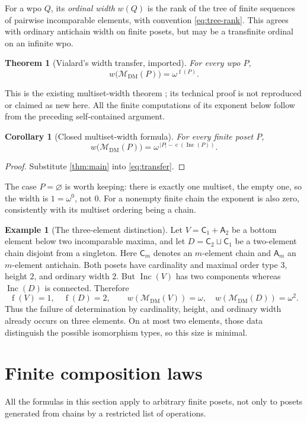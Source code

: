 \documentclass[11pt,letterpaper]{article}
\newtheorem{theorem}{Theorem}[section]
\newtheorem{corollary}[corollary]{Corollary}
\theoremstyle{definition}
\newtheorem{example}[example]{Example}
\theoremstyle{remark}
\newcommand{\fot}{\operatorname{f}}
\newcommand{\Inc}{\operatorname{Inc}}
\newcommand{\cc}{\operatorname{c}}
\newcommand{\DM}{\mathrm{DM}}
\newcommand{\M}{\mathcal M}
\newcommand{\C}{\mathsf C}
\newcommand{\A}{\mathsf A}
\begin{document}
For a wpo $Q$, its \emph{ordinal width} $w(Q)$ is the rank of the tree of
finite sequences of pairwise incomparable elements, with convention
\eqref{eq:tree-rank}. This agrees with ordinary antichain width on finite
posets, but may be a transfinite ordinal on an infinite wpo.

\begin{theorem}[Vialard's width transfer, imported]\label{thm:transfer}
For every wpo $P$,
\begin{equation}\label{eq:transfer}
 w\bigl(\M_{\DM}(P)\bigr)=\omega^{\fot(P)}.
\end{equation}
\end{theorem}
This is the existing multiset-width theorem
\cite[Theorem~5.3.3]{VialardThesis}; its technical proof is not reproduced
or claimed as new here. All the finite computations of its exponent below
follow from the preceding self-contained argument.

\begin{corollary}[Closed multiset-width formula]\label{cor:multiset}
For every finite poset $P$,
\[
 w\bigl(\M_{\DM}(P)\bigr)=\omega^{\,|P|-\cc(\Inc(P))}.
\]
\end{corollary}
\begin{proof}
Substitute \cref{thm:main} into \eqref{eq:transfer}.
\end{proof}

The case $P=\varnothing$ is worth keeping: there is exactly one multiset,
the empty one, so the width is $1=\omega^0$, not $0$.
For a nonempty finite chain the exponent is also zero, consistently with
its multiset ordering being a chain.

\begin{example}[The three-element distinction]\label{ex:three}
Let $V=\C_1+\A_2$ be a bottom element below two incomparable maxima, and let
$D=\C_2\sqcup\C_1$ be a two-element chain disjoint from a singleton.
Here $\C_m$ denotes an $m$-element chain and $\A_m$ an $m$-element antichain.
Both posets have cardinality and maximal order type $3$, height $2$, and
ordinary width $2$. But $\Inc(V)$ has two components whereas $\Inc(D)$ is
connected. Therefore
\[
 \fot(V)=1,\quad \fot(D)=2,\qquad
 w(\M_{\DM}(V))=\omega,\quad w(\M_{\DM}(D))=\omega^2.
\]
Thus the failure of determination by cardinality, height, and ordinary width
already occurs on three elements. On at most two elements, those data
distinguish the possible isomorphism types, so this size is minimal.
\end{example}

\section{Finite composition laws}
\label{sec:composition}
All the formulas in this section apply to arbitrary finite posets, not only
to posets generated from chains by a restricted list of operations.
\end{document}
